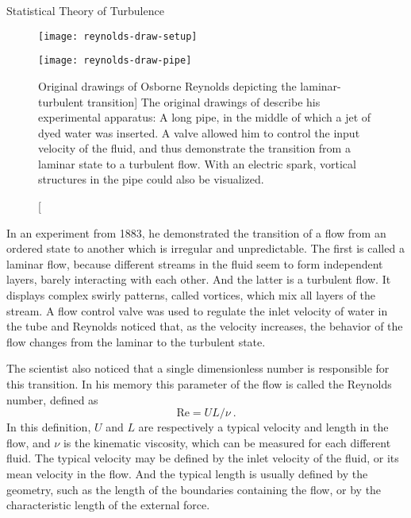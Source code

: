 \begin{chapter}{Statistical Theory of Turbulence}
\begin{figure}[t]
    \centering
    \begin{minipage}{0.45\textwidth}
        \centering
        \texttt{[image: reynolds-draw-setup]} %
    \end{minipage}\hfill
    \begin{minipage}{0.45\textwidth}
        \centering
        \texttt{[image: reynolds-draw-pipe]} %
    \end{minipage}
    \caption
    [Original drawings of Osborne Reynolds depicting the la\-mi\-nar-turbulent transition]
    {The original drawings of \textcite{reynolds1883} describe his experimental apparatus: A long pipe, in the middle of which a jet of dyed water was inserted. A valve allowed him to control the input velocity of the fluid, and thus demonstrate the transition from a laminar state to a turbulent flow. With an electric spark, vortical structures in the pipe could also be visualized.}
    \label{fig:reynolds-draw}
\end{figure}

In an experiment from 1883, he
demonstrated the transition of a flow from an ordered state to another
which is irregular and unpredictable.
The first is called a laminar flow, because different streams in
the fluid seem to form
independent layers, barely interacting with each other.
And the latter is a turbulent flow. It displays complex
swirly patterns, called vortices, which mix
all layers of the stream.
A flow control
valve was used to regulate the inlet velocity of water in the tube and Reynolds noticed
that, as the velocity increases, the behavior of the flow changes from
the laminar to the turbulent state.

The scientist also noticed that a single dimensionless number is responsible
for this transition. In his memory this parameter of the flow is
called the Reynolds number, defined as
\begin{equation} \label{eq:reynolds}
 \mathrm{Re} = U L /\nu \ .
\end{equation}
In this definition, $U$ and $L$ are respectively a typical
velocity and length in the flow, and $\nu$ is the kinematic viscosity,
which can be measured for each different fluid.
The typical velocity may be defined by the inlet velocity of the fluid,
or its mean velocity in the flow. And the typical length is usually
defined by the geometry, such as the length of the boundaries
containing the flow, or by the characteristic length of the external force.


\end{chapter}

